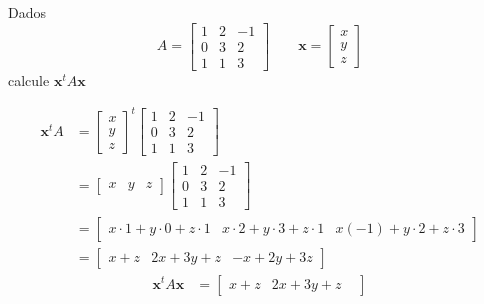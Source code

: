\documentclass[a4paper,12pt,fleqn]{article}
\begin{document}

Dados
\[
  A =
  \begin{bmatrix}
    1 & 2 & -1 \\
    0 & 3 & 2  \\
    1 & 1 & 3
  \end{bmatrix}
\qquad
  \mathbf{x} =
  \begin{bmatrix}
    x \\ y \\ z
  \end{bmatrix}
\]
calcule \(\mathbf{x}^t A \mathbf{x}\)

\begin{answer}
  \begin{align*}
    \mathbf{x}^t A
    & =
    \begin{bmatrix}
      x \\ y \\ z
    \end{bmatrix}^t
    \begin{bmatrix}
      1 & 2 & -1 \\
      0 & 3 & 2  \\
      1 & 1 & 3
    \end{bmatrix}
    \\[2mm]
    & =
    \begin{bmatrix}
      x & y & z
    \end{bmatrix}
    \begin{bmatrix}
      1 & 2 & -1 \\
      0 & 3 & 2  \\
      1 & 1 & 3
    \end{bmatrix}
    \\[2mm]
    & =
    \begin{bmatrix}
      x \cdot 1 + y \cdot 0 + z \cdot 1 &
      x \cdot 2 + y \cdot 3 + z \cdot 1 &
      x(-1)     + y \cdot 2 + z \cdot 3
    \end{bmatrix}
    \\[2mm]
    & =
    \begin{bmatrix}
      x + z &
      2x + 3y + z &
      -x + 2y + 3z
    \end{bmatrix}
  \end{align*}
  \begin{align*}
    \mathbf{x}^t A \mathbf{x}
    & =
    \begin{bmatrix}
      x + z &
      2x + 3y + z &

\end{bmatrix}
\end{align*}
\end{answer}
\end{document}
